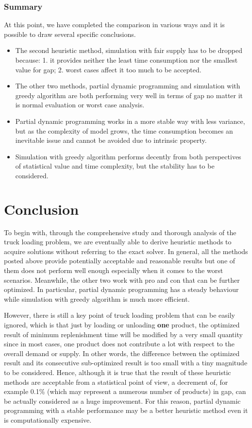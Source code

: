 \documentclass{article}
\begin{document}
\subsubsection{Summary}
At this point, we have completed the comparison in various ways and it is possible to draw several specific conclusions.

\begin{itemize}
\item The second heuristic method, simulation with fair supply has to be dropped because: 1. it provides neither the least time consumption nor the smallest value for gap; 2. worst cases affect it too much to be accepted.
\item The other two methods, partial dynamic programming and simulation with greedy algorithm are both performing very well in terms of gap no matter it is normal evaluation or worst case analysis.
\item Partial dynamic programming works in a more stable way with less variance, but as the complexity of model grows, the time consumption becomes an inevitable issue and cannot be avoided due to intrinsic property.
\item Simulation with greedy algorithm performs decently from both perspectives of statistical value and time complexity, but the stability has to be considered.
\end{itemize}

\section{Conclusion }
To begin with, through the comprehensive study and thorough analysis of the truck loading problem, we are eventually able to derive heuristic methods to acquire solutions without referring to the exact solver. In general, all the methods posted above provide potentially acceptable and reasonable results but one of them does not perform well enough especially when it comes to the worst scenarios. Meanwhile, the other two work with pro and con that can be further optimized. In particular, partial dynamic programming has a steady behaviour while simulation with greedy algorithm is much more efficient. 

However, there is still a key point of truck loading problem that can be easily ignored, which is that just by loading or unloading \textbf{one} product, the optimized result of minimum replenishment time will be modified by a very small quantity since in most cases, one product does not contribute a lot with respect to the overall demand or supply. In other words, the difference between the optimized result and its consecutive sub-optimized result is too small with a tiny magnitude to be considered. Hence, although it is true that the result of these heuristic methods are acceptable from a statistical point of view, a decrement of, for example 0.1\% (which may represent a numerous number of products) in gap, can be actually considered as a huge improvement. For this reason, partial dynamic programming with a stable performance may be a better heuristic method even it is computationally expensive.
\end{document}
